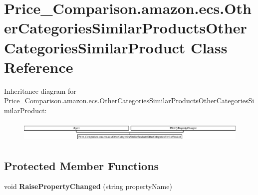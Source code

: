 \hypertarget{class_price___comparison_1_1amazon_1_1ecs_1_1_other_categories_similar_products_other_categories_similar_product}{\section{Price\-\_\-\-Comparison.\-amazon.\-ecs.\-Other\-Categories\-Similar\-Products\-Other\-Categories\-Similar\-Product Class Reference}
\label{class_price___comparison_1_1amazon_1_1ecs_1_1_other_categories_similar_products_other_categories_similar_product}
}


 


Inheritance diagram for Price\-\_\-\-Comparison.\-amazon.\-ecs.\-Other\-Categories\-Similar\-Products\-Other\-Categories\-Similar\-Product\-:\begin{figure}[H]
\begin{center}
\leavevmode
\includegraphics[height=1.009009cm]{class_price___comparison_1_1amazon_1_1ecs_1_1_other_categories_similar_products_other_categories_similar_product}
\end{center}
\end{figure}
\subsection*{Protected Member Functions}
\begin{DoxyCompactItemize}
\item 
\hypertarget{class_price___comparison_1_1amazon_1_1ecs_1_1_other_categories_similar_products_other_categories_similar_product_aa494cb703f85feb98be082963d7229fa}{void {\bfseries Raise\-Property\-Changed} (string property\-Name)}\label{class_price___comparison_1_1amazon_1_1ecs_1_1_other_categories_similar_products_other_categories_similar_product_aa494cb703f85feb98be082963d7229fa}

\end{DoxyCompactItemize}
